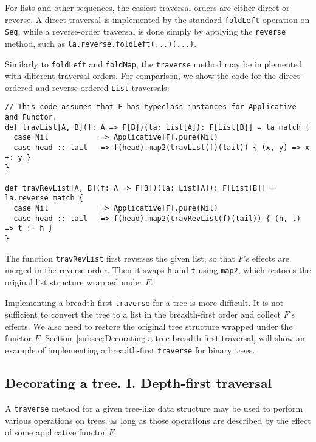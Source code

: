 For lists and other sequences, the easiest traversal orders are either
direct or reverse. A direct traversal is implemented by the standard
\lstinline!foldLeft! operation on \lstinline!Seq!, while a reverse-order
traversal is done simply by applying the \lstinline!reverse! method,
such as \lstinline!la.reverse.foldLeft(...)(...)!.

Similarly to \lstinline!foldLeft! and \lstinline!foldMap!, the \lstinline!traverse!
method may be implemented with different traversal orders. For comparison,
we show the code for the direct-ordered and reverse-ordered \lstinline!List!
traversals:
\begin{lstlisting}
// This code assumes that F has typeclass instances for Applicative and Functor.
def travList[A, B](f: A => F[B])(la: List[A]): F[List[B]] = la match {
  case Nil            => Applicative[F].pure(Nil)
  case head :: tail   => f(head).map2(travList(f)(tail)) { (x, y) => x +: y }
}

def travRevList[A, B](f: A => F[B])(la: List[A]): F[List[B]] = la.reverse match {
  case Nil            => Applicative[F].pure(Nil)
  case head :: tail   => f(head).map2(travRevList(f)(tail)) { (h, t) => t :+ h }
}
\end{lstlisting}
The function \lstinline!travRevList! first reverses the given list,
so that $F$\textsf{'}s effects are merged in the reverse order. Then it swaps
\lstinline!h! and \lstinline!t! using \lstinline!map2!, which restores
the original list structure wrapped under $F$.

Implementing a breadth-first \lstinline!traverse! for a tree is more
difficult. It is not sufficient to convert the tree to a list in the
breadth-first order and collect $F$\textsf{'}s effects. We also need to restore
the original tree structure wrapped under the functor $F$. Section~\ref{subsec:Decorating-a-tree-breadth-first-traversal}
will show an example of implementing a breadth-first \lstinline!traverse!
for binary trees.

\subsection{Decorating a tree. I. Depth-first traversal}

A \lstinline!traverse! method for a given tree-like data structure
may be used to perform various operations on trees, as long as those
operations are described by the effect of some applicative functor
$F$. 

